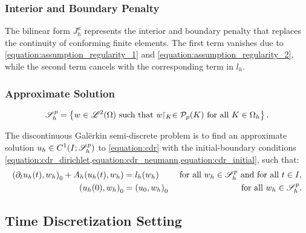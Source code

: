 \newpage
\subsubsection{Interior and Boundary Penalty}

The bilinear form $J^{\kappa}_h$ represents the interior and boundary penalty that replaces the continuity of conforming finite elements. The first term vanishes due to \cref{equation:assumption_regularity_1} and \cref{equation:assumption_regularity_2}, while the second term cancels with the corresponding term in $l_h$.

\subsubsection{Approximate Solution}

\begin{definition}[$\SpaceSolution_h^p$]
    \begin{align}
        \mathscr{S}_h^p = \left\{ w \in \mathscr{L}^{2}(\Omega) \text{ such that } w \!\!\restriction_{K} \in \mathcal{P}_{p}(K) \text{ for all } K \in \Omega_h \right\}.
    \end{align}
\end{definition}

The discontinuous Galërkin semi-discrete problem is to find an approximate solution $u_h \in C^1(I; \mathscr{S}_h^p)$ to \cref{equation:cdr} with the initial-boundary conditions \cref{equation:cdr_dirichlet,equation:cdr_neumann,equation:cdr_initial}, such that:
\begin{align}
    \left( \partial_t u_h(t), w_h \right)_0 + A_h(u_h(t), w_h) &= l_h(w_h) &\text{ for all } w_h \in \mathscr{S}_h^p \text{ and for all } t \in I, \\
    \left( u_h(0), w_h \right)_0 &= \left( u_0, w_h \right)_0 &\text{ for all } w_h \in \mathscr{S}_h^p.
\end{align}

\newpage
\subsection{Time Discretization Setting}

